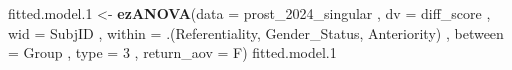 \documentclass[
]{article}
\newenvironment{Shaded}{\begin{snugshade}}{\end{snugshade}}
\newcommand{\AttributeTok}[1]{\textcolor[rgb]{0.13,0.29,0.53}{#1}}
\newcommand{\DecValTok}[1]{\textcolor[rgb]{0.00,0.00,0.81}{#1}}
\newcommand{\FloatTok}[1]{\textcolor[rgb]{0.00,0.00,0.81}{#1}}
\newcommand{\FunctionTok}[1]{\textcolor[rgb]{0.13,0.29,0.53}{\textbf{#1}}}
\newcommand{\NormalTok}[1]{#1}
\newcommand{\OtherTok}[1]{\textcolor[rgb]{0.56,0.35,0.01}{#1}}
\begin{document}
\begin{Shaded}
\begin{Highlighting}[]
\NormalTok{fitted.model}\FloatTok{.1} \OtherTok{\textless{}{-}} \FunctionTok{ezANOVA}\NormalTok{(}\AttributeTok{data =}\NormalTok{ prost\_2024\_singular}
\NormalTok{              , }\AttributeTok{dv =}\NormalTok{ diff\_score}
\NormalTok{              , }\AttributeTok{wid =}\NormalTok{ SubjID}
\NormalTok{              , }\AttributeTok{within =}\NormalTok{ .(Referentiality, Gender\_Status, Anteriority)}
\NormalTok{              , }\AttributeTok{between =}\NormalTok{ Group}
\NormalTok{              , }\AttributeTok{type =} \DecValTok{3}
\NormalTok{              , }\AttributeTok{return\_aov =}\NormalTok{ F)}
\NormalTok{fitted.model}\FloatTok{.1}
\end{Highlighting}
\end{Shaded}
\end{document}
